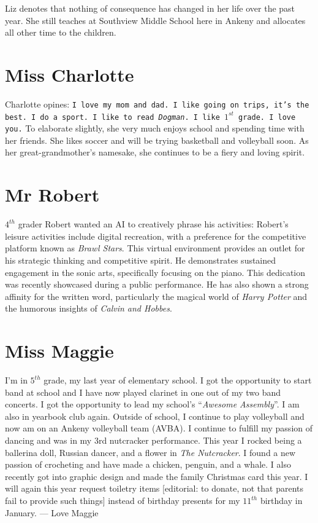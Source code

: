 \documentclass[letterpaper,11pt]{article}
\begin{document}
\begin{multicols}{2}
Liz denotes that nothing of consequence has changed in her life over the past
year. She still teaches at Southview Middle School here in Ankeny and allocates
all other time to the children.

\section{Miss Charlotte}

Charlotte opines: \texttt{I love my mom and dad. I like going on trips, it's the best.
I do a sport. I like to read \textit{Dogman}. I like ${1}^{st}$ grade. I love you.}
To elaborate slightly, she
very much enjoys school and spending time with her friends.  She likes soccer and
will be trying basketball and volleyball soon. As her great-grandmother's namesake,
she continues to be a fiery and loving spirit.

\section{Mr Robert}

${4}^{th}$ grader Robert wanted an AI to creatively phrase his activities:
Robert's leisure activities include digital recreation, with a 
preference for the competitive platform known as \textit{Brawl Stars}. This
virtual environment provides an outlet for his strategic thinking and
competitive spirit. He demonstrates sustained engagement in the sonic arts,
specifically focusing on the piano. This dedication was recently showcased
during a public performance. He has also shown a strong affinity for the written
word, particularly the magical world of \textit{Harry Potter} and the humorous insights
of \textit{Calvin and Hobbes}.

\section{Miss Maggie}

I’m in ${5}^{th}$ grade, my last year of elementary school. I got the
opportunity to start band at school and I have now played clarinet in one out
of my two band concerts. I got the opportunity to lead my school's
\textquotedblleft{\textit{Awesome Assembly}}\textquotedblright. I am also in yearbook club again. Outside of school,
I continue to play volleyball and now am on an Ankeny volleyball team (AVBA).
I continue to fulfill my passion of dancing and was in my 3rd nutcracker
performance. This year I rocked being a ballerina doll, Russian dancer, and a
flower in \textit{The Nutcracker}. I found a new passion of crocheting and have made a
chicken, penguin, and a whale. I also recently got into graphic design and made
the family Christmas card this year. I will again this year request toiletry
items [editorial: to donate, not that parents fail to provide such things] instead of birthday presents for my ${11}^{th}$ birthday in January. --- Love Maggie


\end{multicols}
\end{document}
